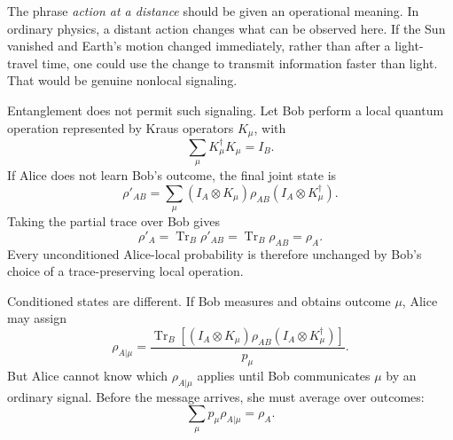 The phrase \emph{action at a distance} should be given an operational meaning. In ordinary physics, a distant action changes what can be observed here. If the Sun vanished and Earth's motion changed immediately, rather than after a light-travel time, one could use the change to transmit information faster than light. That would be genuine nonlocal signaling.

Entanglement does not permit such signaling. Let Bob perform a local quantum operation represented by Kraus operators \(K_\mu\), with
\begin{equation}
\sum_\mu K_\mu^\dagger K_\mu=I_B.
\end{equation}
If Alice does not learn Bob's outcome, the final joint state is
\begin{equation}
\rho'_{AB}
=\sum_\mu
(I_A\otimes K_\mu)\rho_{AB}
(I_A\otimes K_\mu^\dagger).
\end{equation}
Taking the partial trace over Bob gives
\begin{equation}
\rho'_A
=\operatorname{Tr}_B\rho'_{AB}
=\operatorname{Tr}_B\rho_{AB}
=\rho_A.
\label{eq:l7-no-signaling}
\end{equation}
Every unconditioned Alice-local probability is therefore unchanged by Bob's choice of a trace-preserving local operation.

Conditioned states are different. If Bob measures and obtains outcome \(\mu\), Alice may assign
\begin{equation}
\rho_{A|\mu}
=\frac{
\operatorname{Tr}_B\!\left[
(I_A\otimes K_\mu)\rho_{AB}
(I_A\otimes K_\mu^\dagger)
\right]
}{p_\mu}.
\label{eq:l7-conditioned-state}
\end{equation}
But Alice cannot know which \(\rho_{A|\mu}\) applies until Bob communicates \(\mu\) by an ordinary signal. Before the message arrives, she must average over outcomes:
\begin{equation}
\sum_\mu p_\mu\rho_{A|\mu}=\rho_A.
\label{eq:l7-conditioned-average}
\end{equation}

\begin{classroomqa}
\end{classroomqa}

